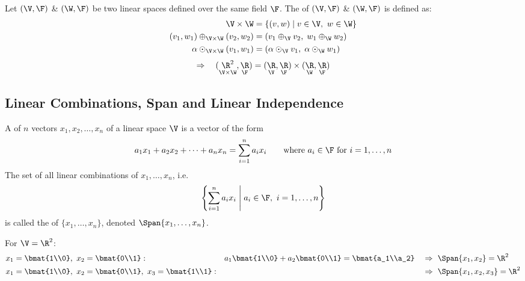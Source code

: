\begin{definition}
Let $(\V,\F)$ \& $(\W,\F)$ be two linear spaces defined over the same field $\F$. The  of $(\V,\F)$ \& $(\W,\F)$ is defined as:
\begin{align*}
\V\times\W &= \{(v,w) \mid v\in\V,\ w\in\W\}\\
(v_1,w_1)\oplus_{\V\times\W}(v_2,w_2) &= (v_1\oplus_{\V} v_2,\; w_1\oplus_{\W} w_2)\\
\alpha\odot_{\V\times\W}(v_1,w_1) &= (\alpha\odot_{\V} v_1,\; \alpha\odot_{\W} w_1)
\end{align*}
\[
\Rightarrow\quad
(\underset{\V\times\W}{\R^2},\underset{\F}{\R}) = (\underset{\V}{\R},\underset{\F}{\R})\times(\underset{\W}{\R},\underset{\F}{\R})
\]
\end{definition}

\subsection{Linear Combinations, Span and Linear Independence}\label{ss:span-li}
\begin{definition}
A  of $n$ vectors $x_1,x_2,\dots,x_n$ of a linear space $\V$ is a vector of the form
\[ a_1x_1+a_2x_2+\dots+a_nx_n = \sum_{i=1}^{n} a_ix_i \qquad \text{where } a_i\in\F \text{ for } i=1,\dots,n \]
The set of all linear combinations of $x_1,\dots,x_n$, i.e.
\[ \left\{ \sum_{i=1}^{n} a_ix_i \;\middle|\; a_i\in\F,\ i=1,\dots,n \right\} \]
is called the  of $\{x_1,\dots,x_n\}$, denoted $\Span\{x_1,\dots,x_n\}$.
\end{definition}

For $\V=\R^2$:
\begin{align*}
&x_1=\bmat{1\\0},\ x_2=\bmat{0\\1}: && a_1\bmat{1\\0}+a_2\bmat{0\\1} = \bmat{a_1\\a_2} &&\Rightarrow\ \Span\{x_1,x_2\}=\R^2\\
&x_1=\bmat{1\\0},\ x_2=\bmat{0\\1},\ x_3=\bmat{1\\1}: && && \Rightarrow\ \Span\{x_1,x_2,x_3\}=\R^2
\end{align*}


